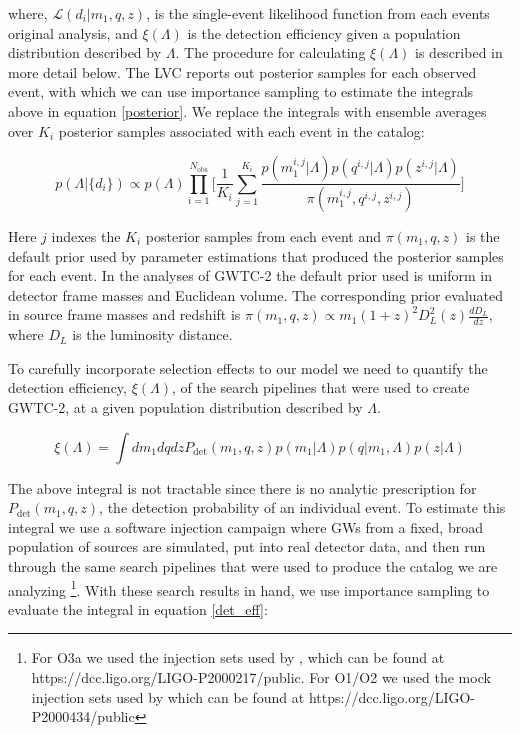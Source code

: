 \documentclass[twocolumn, linenumber]{aastex63}
\begin{document}
\noindent
where, $\mathcal{L}(d_i|m_1, q, z)$, is the single-event likelihood function from each events original analysis, and $\xi(\Lambda)$ 
is the detection efficiency given a population distribution described by $\Lambda$. The procedure for calculating $\xi(\Lambda)$ is 
described in more detail below. The LVC reports out posterior samples for each observed event, with which we can use importance sampling 
to estimate the integrals above in equation \ref{posterior}. We replace the integrals with ensemble averages over $K_i$ posterior samples 
associated with each event in the catalog:

\begin{equation}
 p\left(\Lambda | \{d_i\}\right) \propto p(\Lambda) \prod_{i=1}^{N_\mathrm{obs}} \bigg[ \frac{1}{K_i} \sum_{j=1}^{K_i} \frac{p(m_1^{i,j}|\Lambda)p(q^{i,j}|\Lambda)p(z^{i,j}|\Lambda)}{\pi(m_1^{i,j}, q^{i,j}, z^{i,j})} \bigg]
\end{equation}

\noindent 
Here $j$ indexes the $K_i$ posterior samples from each event and $\pi(m_1, q, z)$ is the default prior used by parameter estimations that 
produced the posterior samples for each event. In the analyses of GWTC-2 the default prior used is uniform in detector frame masses and 
Euclidean volume. The corresponding prior evaluated in source frame masses and redshift is 
$\pi(m_1, q, z) \propto m_1(1+z)^2 D_L^2(z) \frac{dD_L}{dz}$, where $D_L$ is the luminosity distance. 

To carefully incorporate selection effects to our model we need to quantify the detection efficiency, $\xi(\Lambda)$, of the search 
pipelines that were used to create GWTC-2, at a given population distribution described by $\Lambda$.
 
\begin{equation} \label{det_eff}
     \xi(\Lambda) = \int dm_1 dq dz P_\mathrm{det}(m_1, q, z)p(m_1 | \Lambda) p(q | m_1, \Lambda) p(z | \Lambda)
\end{equation}
 
\noindent The above integral is not tractable since there is no analytic prescription for $P_\mathrm{det}(m_1,q,z)$, the detection 
probability of an individual event. To estimate this integral we use a software injection campaign where GWs from a fixed, broad 
population of sources are simulated, put into real detector data, and then run through the same search pipelines that were used to 
produce the catalog we are analyzing \footnote{For O3a we used the injection sets used by \citet{o3a_pop}, which can be found at 
https://dcc.ligo.org/LIGO-P2000217/public. For O1/O2 we used the mock injection sets used by \citet{o1o2_pop} which can be found at 
https://dcc.ligo.org/LIGO-P2000434/public}. With these search results in hand, we use importance sampling to evaluate the integral 
in equation \ref{det_eff}:
\end{document}
